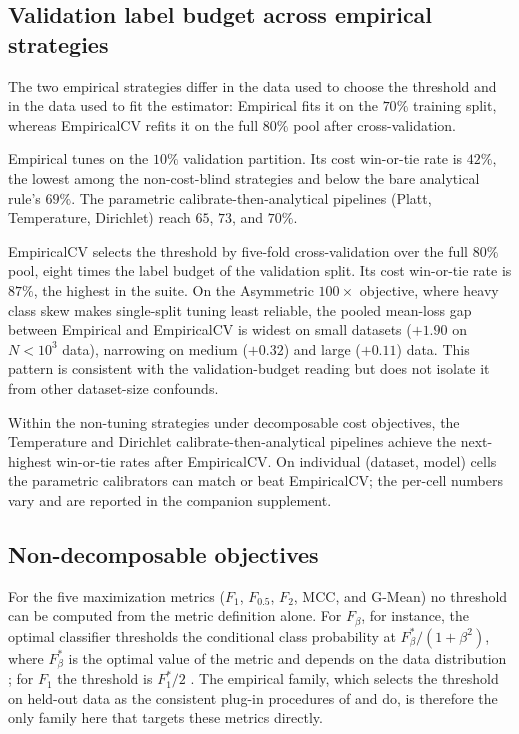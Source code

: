 \subsection{Validation label budget across empirical strategies}

The two empirical strategies differ in the data used to choose the threshold and in the data used to fit the estimator: Empirical fits it on the $70\%$ training split, whereas EmpiricalCV refits it on the full $80\%$ pool after cross-validation.

Empirical tunes on the $10\%$ validation partition. Its cost win-or-tie rate is $42\%$, the lowest among the non-cost-blind strategies and below the bare analytical rule's $69\%$. The parametric calibrate-then-analytical pipelines (Platt, Temperature, Dirichlet) reach $65$, $73$, and $70\%$.

EmpiricalCV selects the threshold by five-fold cross-validation over the full $80\%$ pool, eight times the label budget of the validation split. Its cost win-or-tie rate is $87\%$, the highest in the suite. On the Asymmetric $100\times$ objective, where heavy class skew makes single-split tuning least reliable, the pooled mean-loss gap between Empirical and EmpiricalCV is widest on small datasets ($+1.90$ on $N < 10^3$ data), narrowing on medium ($+0.32$) and large ($+0.11$) data. This pattern is consistent with the validation-budget reading but does not isolate it from other dataset-size confounds.

Within the non-tuning strategies under decomposable cost objectives, the Temperature and Dirichlet calibrate-then-analytical pipelines achieve the next-highest win-or-tie rates after EmpiricalCV\@. On individual (dataset, model) cells the parametric calibrators can match or beat EmpiricalCV\@; the per-cell numbers vary and are reported in the companion supplement.

\subsection{Non-decomposable objectives}

For the five maximization metrics ($F_1$, $F_{0.5}$, $F_2$, MCC, and G-Mean) no threshold can be computed from the metric definition alone. For $F_\beta$, for instance, the optimal classifier thresholds the conditional class probability at $F_\beta^*/(1+\beta^2)$, where $F_\beta^*$ is the optimal value of the metric and depends on the data distribution \citep{koyejo2014consistent}; for $F_1$ the threshold is $F_1^*/2$ \citep{lipton2014optimal}. The empirical family, which selects the threshold on held-out data as the consistent plug-in procedures of \citet{koyejo2014consistent} and \citet{narasimhan2014statistical} do, is therefore the only family here that targets these metrics directly.

